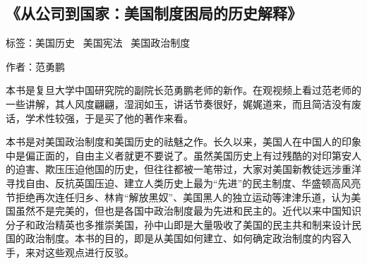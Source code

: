 \subsection{《从公司到国家：美国制度困局的历史解释》}

标签：美国历史 \ 美国宪法 \ 美国政治制度

作者：范勇鹏

本书是复旦大学中国研究院的副院长范勇鹏老师的新作。在观视频上看过范老师的一些讲解，其人风度翩翩，湿润如玉，讲话节奏很好，娓娓道来，而且简洁没有废话，学术性较强，于是买了他的著作来看。

本书是对美国政治制度和美国历史的祛魅之作。长久以来，美国人在中国人的印象中是偏正面的，自由主义者就更不要说了。虽然美国历史上有过残酷的对印第安人的迫害、欺压压迫他国的历史，但往往都被一笔带过，大家对美国新教徒远涉重洋寻找自由、反抗英国压迫、建立人类历史上最为“先进”的民主制度、华盛顿高风亮节拒绝再次连任归乡、林肯“解放黑奴”、美国黑人的独立运动等津津乐道，认为美国虽然不是完美的，但也是各国中政治制度最为先进和民主的。近代以来中国知识分子和政治精英也多推崇美国，孙中山即是大量吸收了美国的民主共和制来设计民国的政治制度。本书的目的，即是从美国如何建立、如何确定政治制度的内容入手，来对这些观点进行反驳。

